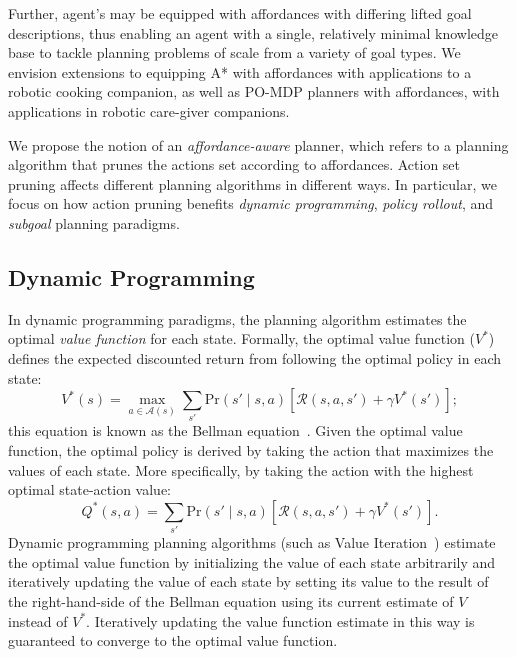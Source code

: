\documentclass[]{article}
\begin{document}
Further, agent's may be equipped with affordances with differing lifted
goal descriptions, thus enabling an agent with a single, relatively minimal
knowledge base to tackle planning problems of scale from a variety of goal types.
We envision extensions to equipping A* with affordances with applications
to a robotic cooking companion, as well as PO-MDP planners with affordances, with
applications in robotic care-giver companions.

We propose the notion of an {\it affordance-aware} planner, which refers to
a planning algorithm that prunes the actions set according to affordances.
Action set pruning affects different planning algorithms in
different ways. In particular, we focus on how action pruning benefits
{\em dynamic programming}, {\em policy rollout}, and {\em subgoal} planning paradigms.

\subsection{Dynamic Programming}
In dynamic programming paradigms, the planning algorithm estimates the
optimal {\em value function} for each state. Formally, the optimal
value function ($V^*$) defines the expected discounted return from
following the optimal policy in each state:
\begin{equation}
\label{eq:bellman}
V^*(s) = \max_{a \in \mathcal{A}(s)} \sum_{s'} \text{Pr}(s' \mid s, a)\left[\mathcal{R}(s,a,s') + \gamma V^*(s') \right];
\end{equation}
this equation is known as the Bellman
equation~\citep{bellman57}. Given the optimal value function, the
optimal policy is derived by taking the action that maximizes the
values of each state. More specifically, by taking the action with the
highest optimal state-action value:
\begin{equation}
\label{eq:qvalue}
Q^*(s,a) = \sum_{s'} \text{Pr}(s' \mid s, a)\left[\mathcal{R}(s,a,s') + \gamma V^*(s') \right].
\end{equation}
Dynamic programming planning algorithms (such as Value
Iteration~\citep{bellman57}) estimate the optimal value function by
initializing the value of each state arbitrarily and iteratively
updating the value of each state by setting its value to the result of
the right-hand-side of the Bellman equation using its current estimate
of $V$ instead of $V^*$. Iteratively updating the value function
estimate in this way is guaranteed to converge to the optimal value
function.
\end{document}
